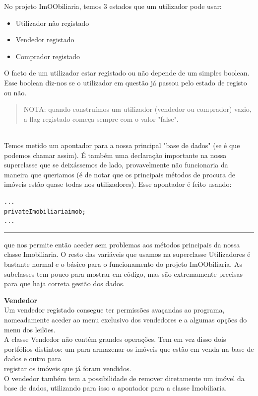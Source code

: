 \documentclass[12pt]{article}
\newenvironment{code}                    
{\textbf{
} \hspace{1cm} \hrulefill \\ 
\smallskip 
\begin{center}
\begin{minipage}{0.9\textwidth} 
\begin{alltt}\small}
{\end{alltt}
\end{minipage}
\end{center}
\hrule\smallskip
}
\begin{document}
No projeto ImOObiliaria, temos 3 estados que um utilizador pode usar:
\newline
\begin{itemize}
\item Utilizador não registado
\item Vendedor registado
\item Comprador registado
\end{itemize}

O facto de um utilizador estar registado ou não depende de um simples boolean.\\ 

Esse boolean diz-nos se o utilizador em questão já passou pelo estado de registo ou não.
~\\
\newline
\begin{quote}
NOTA: quando construímos um utilizador (vendedor ou comprador) vazio, a flag registado começa sempre com o valor "false".
\end{quote}

~\\
Temos metido um apontador para a nossa principal "base de dados" (se é que podemos chamar assim). 
É também uma declaração importante na nossa superclasse que se deixássemos de lado, provavelmente não funcionaria da maneira que queriamos (é de notar que os principais métodos de procura de imóveis estão quase todas nos utilizadores).
\newline
Esse apontador é feito usando:
\newline
\begin{code}
...
    private Imobiliaria imob;
...
\end{code}
que nos permite então aceder sem problemas aos métodos principais da nossa classe Imobiliaria.
\newline
O resto das variáveis que usamos na superclasse Utilizadores é bastante normal e o básico para o funcionamento do projeto ImOObiliaria.
\newline
As subclasses tem pouco para mostrar em código, mas são extremamente precisas para que haja correta gestão dos dados.
\pagebreak

\textbf{Vendedor}
~\\
Um vendedor registado consegue ter permissões avaçandas ao programa, nomeadamente aceder ao menu exclusivo dos vendedores e a algumas opções do menu dos leilões. \\
A classe Vendedor não contém grandes operações. Tem em vez disso dois portfólios distintos: um para armazenar os imóveis que estão em venda na base de dados e outro para\\
registar os imóveis que já foram vendidos.
~\\
O vendedor também tem a possibilidade de remover diretamente um imóvel da base de dados, utilizando para isso o apontador para a classe Imobiliaria.
\end{document}
